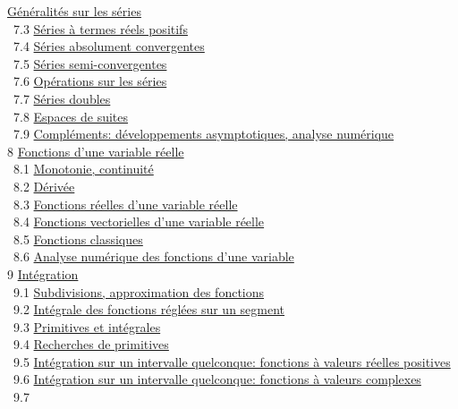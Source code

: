 \documentclass[]{article}
\begin{document}
\href{coursse36.html\#x46-2090007.2}{Généralités sur les séries} \\ ~7.3
\href{coursse37.html\#x47-2120007.3}{Séries à termes réels positifs} \\
~7.4 \href{coursse38.html\#x48-2170007.4}{Séries absolument
convergentes} \\ ~7.5 \href{coursse39.html\#x49-2230007.5}{Séries
semi-convergentes} \\ ~7.6
\href{coursse40.html\#x50-2260007.6}{Opérations sur les séries} \\ ~7.7
\href{coursse41.html\#x51-2310007.7}{Séries doubles} \\ ~7.8
\href{coursse42.html\#x52-2320007.8}{Espaces de suites} \\ ~7.9
\href{coursse43.html\#x53-2330007.9}{Compléments: développements
asymptotiques, analyse numérique} \\ 8
\href{coursch9.html\#x54-2360008}{Fonctions d'une variable réelle} \\
~8.1 \href{coursse44.html\#x55-2370008.1}{Monotonie, continuité} \\ ~8.2
\href{coursse45.html\#x56-2400008.2}{Dérivée} \\ ~8.3
\href{coursse46.html\#x57-2440008.3}{Fonctions réelles d'une variable
réelle} \\ ~8.4 \href{coursse47.html\#x58-2510008.4}{Fonctions
vectorielles d'une variable réelle} \\ ~8.5
\href{coursse48.html\#x59-2550008.5}{Fonctions classiques} \\ ~8.6
\href{coursse49.html\#x60-2590008.6}{Analyse numérique des fonctions
d'une variable} \\ 9 \href{coursch10.html\#x61-2630009}{Intégration} \\
~9.1 \href{coursse50.html\#x62-2640009.1}{Subdivisions, approximation
des fonctions} \\ ~9.2 \href{coursse51.html\#x63-2680009.2}{Intégrale
des fonctions réglées sur un segment} \\ ~9.3
\href{coursse52.html\#x64-2740009.3}{Primitives et intégrales} \\ ~9.4
\href{coursse53.html\#x65-2790009.4}{Recherches de primitives} \\ ~9.5
\href{coursse54.html\#x66-2870009.5}{Intégration sur un intervalle
quelconque: fonctions à valeurs réelles positives} \\ ~9.6
\href{coursse55.html\#x67-2910009.6}{Intégration sur un intervalle
quelconque: fonctions à valeurs complexes} \\ ~9.7
\end{document}

